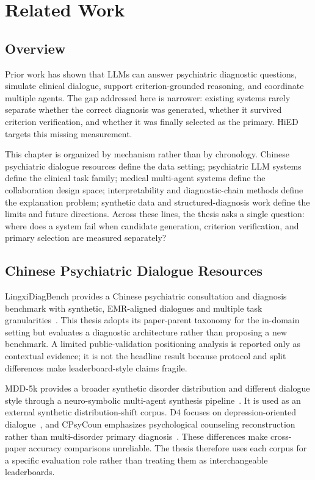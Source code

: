 \chapter{Related Work}
\label{ch:related}

\section{Overview}

Prior work has shown that LLMs can answer psychiatric diagnostic questions, simulate clinical dialogue, support criterion-grounded reasoning, and coordinate multiple agents. The gap addressed here is narrower: existing systems rarely separate whether the correct diagnosis was generated, whether it survived criterion verification, and whether it was finally selected as the primary. HiED targets this missing measurement.

This chapter is organized by mechanism rather than by chronology. Chinese psychiatric dialogue resources define the data setting; psychiatric LLM systems define the clinical task family; medical multi-agent systems define the collaboration design space; interpretability and diagnostic-chain methods define the explanation problem; synthetic data and structured-diagnosis work define the limits and future directions. Across these lines, the thesis asks a single question: where does a system fail when candidate generation, criterion verification, and primary selection are measured separately?

\section{Chinese Psychiatric Dialogue Resources}

LingxiDiagBench provides a Chinese psychiatric consultation and diagnosis benchmark with synthetic, EMR-aligned dialogues and multiple task granularities~\citep{xu2026lingxidiagbench}. This thesis adopts its paper-parent taxonomy for the in-domain setting but evaluates a diagnostic architecture rather than proposing a new benchmark. A limited public-validation positioning analysis is reported only as contextual evidence; it is not the headline result because protocol and split differences make leaderboard-style claims fragile.

MDD-5k provides a broader synthetic disorder distribution and different dialogue style through a neuro-symbolic multi-agent synthesis pipeline~\citep{yin2024mdd5k}. It is used as an external synthetic distribution-shift corpus. D4 focuses on depression-oriented dialogue~\citep{yao2022d4}, and CPsyCoun emphasizes psychological counseling reconstruction rather than multi-disorder primary diagnosis~\citep{zhang2024cpsycoun}. These differences make cross-paper accuracy comparisons unreliable. The thesis therefore uses each corpus for a specific evaluation role rather than treating them as interchangeable leaderboards.


